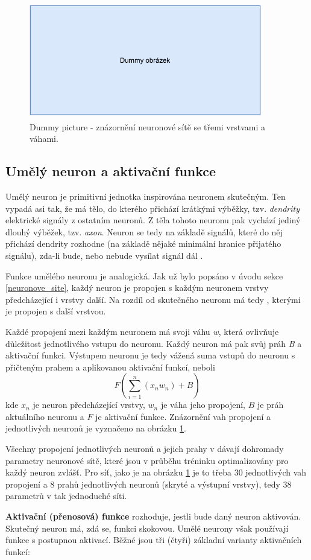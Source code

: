 \begin{figure}[hbt]
	\centering
	\includegraphics[width=4.0in, height=2in]{obrazky/dummy_pic.pdf}
	\caption{Dummy picture - znázornění neuronové sítě se třemi vrstvami a váhami.}
	\label{three_layers}
\end{figure}

\subsection{Umělý neuron a aktivační funkce}
Umělý neuron je primitivní jednotka inspirována neuronem skutečným. Ten vypadá asi tak, že má tělo, do kterého přichází krátkými výběžky, tzv. \emph{dendrity} elektrické signály z ostatním neuronů. Z těla tohoto neuronu pak vychází jediný dlouhý výběžek, tzv. \emph{axon}. Neuron se tedy na základě signálů, které do něj přichází dendrity rozhodne (na základě nějaké minimální hranice přijatého signálu), zda-li bude, nebo nebude vysílat signál dál \cite{wiki:neuron}.\par
Funkce umělého neuronu je analogická. Jak už bylo popsáno v úvodu sekce \ref{neuronove_site}, každý neuron je propojen s každým neuronem vrstvy předcházející i vrstvy další. Na rozdíl od skutečného neuronu má tedy , kterými je propojen s další vrstvou.\par
Každé propojení mezi každým neuronem má svoji váhu \emph{w}, která ovlivňuje důležitost jednotlivého vstupu do neuronu. Každý neuron má pak svůj práh \emph{B} a aktivační funkci. Výstupem neuronu je tedy vážená suma vstupů do neuronu s přičteným prahem a aplikovanou aktivační funkcí, neboli 
$$F({\sum_{i=1}^n ({x_n}w_n)} + B)$$
kde $x_n$ je neuron předcházející vrstvy, $w_n$ je váha jeho propojení, $B$ je práh aktuálního neuronu a $F$ je aktivační funkce. Znázornění vah propojení a jednotlivých neuronů je vyznačeno na obrázku \ref{three_layers}.\par
Všechny propojení jednotlivých neuronů a jejich prahy v dávají dohromady parametry neuronové sítě, které jsou v průběhu tréninku optimalizovány pro každý neuron zvlášť. Pro síť, jako je na obrázku \ref{three_layers} je to třeba 30 jednotlivých vah propojení a 8 prahů jednotlivých neuronů (skryté a výstupní vrstvy), tedy 38 parametrů v tak jednoduché síti.\par
\textbf{Aktivační (přenosová) funkce} rozhoduje, jestli bude daný neuron aktivován. Skutečný neuron má, zdá se, funkci skokovou. Umělé neurony však používají funkce s postupnou aktivací. Běžné jsou tři (čtyři) základní varianty aktivačních funkcí: 

